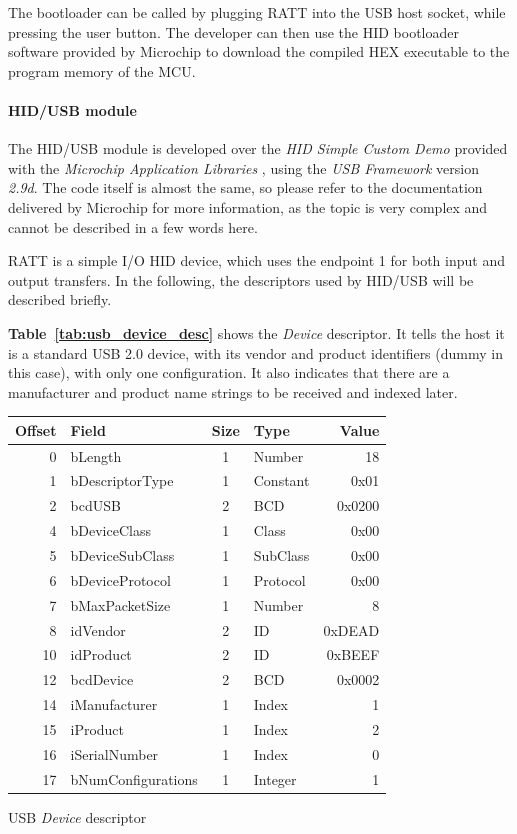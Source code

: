 \documentclass[a4paper,10pt]{article}
\makeatletter
\newenvironment{tablehere}{\def\@captype{table}\vspace{2ex}}{\vspace{2ex}}
\newcommand{\citet}[1]{\textbf{Table~\ref{#1}}}
\makeatother
\begin{document}
\begin{multicols}{2}
The bootloader can be called by plugging RATT into the USB host socket, while
pressing the user button. The developer can then use the HID bootloader
software provided by Microchip to download the compiled HEX executable to the
program memory of the MCU.


\paragraph{HID/USB module}
The HID/USB module is developed over the \emph{HID Simple Custom Demo}
provided with the \emph{Microchip Application Libraries} \cite{microchip_mal},
using the \emph{USB Framework} version \emph{2.9d}. The code itself is almost
the same, so please refer to the documentation delivered by Microchip for more
information, as the topic is very complex and cannot be described in a few
words here.

RATT is a simple I/O HID device, which uses the endpoint 1 for both input and
output transfers. In the following, the descriptors used by HID/USB will be
described briefly.

\citet{tab:usb_device_desc} shows the \emph{Device} descriptor. It tells the
host it is a standard USB 2.0 device, with its vendor and product identifiers
(dummy in this case), with only one configuration. It also indicates that
there are a manufacturer and product name strings to be received and indexed
later.

\begin{tablehere}
\centering \footnotesize
\begin{tabular}{|r|l|c|l|r|}
\hline
\textbf{Offset} & \textbf{Field} & \textbf{Size} & \textbf{Type} & \textbf{Value}	\\
\hline
0	& bLength				& 1	& Number	& 18		\\
1	& bDescriptorType		& 1	& Constant	& 0x01		\\
2	& bcdUSB				& 2	& BCD		& 0x0200	\\
4	& bDeviceClass			& 1	& Class		& 0x00		\\
5	& bDeviceSubClass		& 1	& SubClass	& 0x00		\\
6	& bDeviceProtocol		& 1	& Protocol	& 0x00		\\
7	& bMaxPacketSize		& 1	& Number	& 8			\\
8	& idVendor				& 2	& ID		& 0xDEAD	\\
10	& idProduct				& 2	& ID		& 0xBEEF	\\
12	& bcdDevice				& 2	& BCD		& 0x0002	\\
14	& iManufacturer			& 1	& Index		& 1			\\
15	& iProduct				& 1	& Index		& 2			\\
16	& iSerialNumber			& 1	& Index		& 0			\\
17	& bNumConfigurations	& 1	& Integer	& 1			\\
\hline
\end{tabular}
\caption{USB \emph{Device} descriptor}
\label{tab:usb_device_desc}
\end{tablehere}


\end{multicols}
\end{document}
